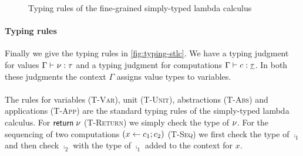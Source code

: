 {\begin{figure}
\caption{Typing rules of the fine-grained simply-typed lambda calculus}
\centering
{}
\end{figure}

\paragraph{Typing rules}
Finally we give the typing rules in \cref{fig:typing-stlc}.
We have a typing judgment for values $\Gamma \vdash \nu : \tau$ and a typing judgment for computations $\Gamma \vdash c : \underline{\tau}$.
In both these judgments the context $\Gamma$ assigns value types to variables.
\\\\
The rules for variables ({\footnotesize\textsc{T-Var}}), unit ({\footnotesize\textsc{T-Unit}}), abstractions ({\footnotesize\textsc{T-Abs}}) and applications ({\footnotesize\textsc{T-App}}) are the standard typing rules of the simply-typed lambda calculus.
For $\mathsf{return} \; \nu$ ({\footnotesize\textsc{T-Return}}) we simply check the type of $\nu$.
For the sequencing of two computations $(x \leftarrow c_1 ; c_2)$ ({\footnotesize\textsc{T-Seq}}) we first check the type of $\comp_1$ and then check $\comp_2$ with the type of $\comp_1$ added to the context for $x$.

\iffalse
}
